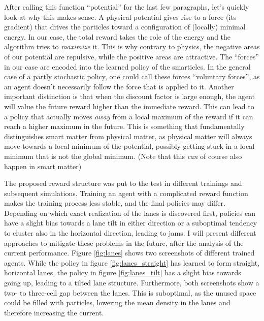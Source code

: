 After calling this function \enquote{potential} for the last few paragraphs, let's quickly look at why this makes sense. A physical potential gives rise to a force (its gradient) that drives the particles toward a configuration of (locally) minimal energy. In our case, the total reward takes the role of the energy and the algorithm tries to \textit{maximize} it. This is why contrary to physics, the negative areas of our potential are repulsive, while the positive areas are attractive. The \enquote{forces} in our case are encoded into the learned policy of the smarticles. In the general case of a partly stochastic policy, one could call these forces \enquote{voluntary forces}, as an agent doesn't necessarily follow the force that is applied to it. Another important distinction is that when the discount factor is large enough, the agent will value the future reward higher than the immediate reward. This can lead to a policy that actually moves \textit{away} from a local maximum of the reward if it can reach a higher maximum in the future. This is something that fundamentally distinguishes smart matter from physical matter, as physical matter will always move towards a local minimum of the potential, possibly getting stuck in a local minimum that is not the global minimum. (Note that this \textit{can} of course also happen in smart matter)


The proposed reward structure was put to the test in different trainings and subsequent simulations. Training an agent with a complicated reward function makes the training process less stable, and the final policies may differ. Depending on which exact realization of the lanes is discovered first, policies can have a slight bias towards a lane tilt in either direction or a suboptimal tendency to cluster also in the horizontal direction, leading to jams. I will present different approaches to mitigate these problems in the future, after the analysis of the current performance. Figure \ref{fig:lanes} shows two screenshots of different trained agents. While the policy in figure \ref{fig:lanes_straight} has learned to form straight, horizontal lanes, the policy in figure \ref{fig:lanes_tilt} has a slight bias towards going up, leading to a tilted lane structure. Furthermore, both screenshots show a two- to three-cell gap between the lanes. This is suboptimal, as the unused space could be filled with particles, lowering the mean density in the lanes and therefore increasing the current. 


